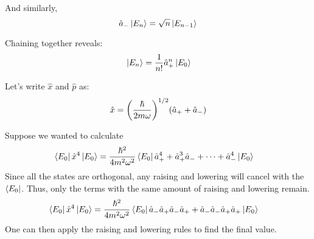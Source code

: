 And similarly,
\[ \hat{a}_{-} \ket*{E_n} = \sqrt{n} \ket*{E_{n - 1}} \]

Chaining together reveals:
\[ \ket*{E_n} = \frac{1}{n!} \hat{a}_{+}^n \ket*{E_0} \]

Let's write $\hat{x}$ and $\hat{p}$ as:
\[ \hat{x} = \qty(\frac{\hbar}{2 m \omega})^{1/2} (\hat{a}_{+} + \hat{a}_{-}) \]

Suppose we wanted to calculate
\begin{align*}
    \bra{E_0} \hat{x}^4 \ket*{E_0} &= \frac{\hbar^2}{4 m^2 \omega^2} \bra{E_0}\hat{a}_{+}^4 + \hat{a}_{+}^3 \hat{a}_{-} + \dots + \hat{a}_{-}^4 \ket*{E_0}
\end{align*} 
Since all the states are orthogonal, any raising and lowering will cancel with the $\bra{E_0}$. Thus,
only the terms with the same amount of raising and lowering remain.
\begin{align*}
    \bra{E_0} \hat{x}^4 \ket*{E_0} &= \frac{\hbar^2}{4m^2 \omega^2} \bra{E_0}\hat{a}_{-}\hat{a}_{+}\hat{a}_{-}\hat{a}_{+} + \hat{a}_{-}\hat{a}_{-}\hat{a}_{+}\hat{a}_{+}\ket{E_0}
\end{align*}
One can then apply the raising and lowering rules to find the final value.